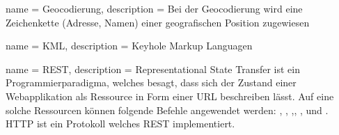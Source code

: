  {
	name = Geocodierung,
	description = {Bei der Geocodierung wird eine Zeichenkette (Adresse, Namen) einer geografischen Position zugewiesen}
}

 {
	name = KML,
	description = {Keyhole Markup Languagen}
}

 {
	name = REST,
	description = {Representational State Transfer\cite{rest} ist ein Programmierparadigma, welches besagt, dass sich der Zustand einer Webapplikation als Ressource in Form einer URL beschreiben lässt. Auf eine solche Ressourcen können folgende Befehle angewendet werden: , , ,, ,  und . HTTP ist ein Protokoll welches REST implementiert.}
}

